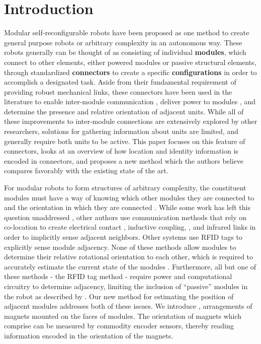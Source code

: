 \section{Introduction}
\label{sec:Introduction}

Modular self-reconfigurable robots have been proposed as one method to create general purpose robots or arbitrary complexity in an autonomous way. These robots generally can be thought of as consisting of individual \textbf{modules}, which connect to other elements, either powered modules or passive structural elements, through standardized \textbf{connectors} to create a specific \textbf{configurations} in order to accomplish a designated task. Aside from their fundamental requirement of providing robust mechanical links, these connectors have been used in the literature to enable inter-module communication \cite{liedke2013collective} \cite{TosunDaveyLiuYim-IROS2016}, deliver power to modules \cite{todo} \cite{todo}, and determine the presence and relative orientation of adjacent units. While all of these improvements to inter-module connections are extensively explored by other researchers, solutions for gathering information about units are limited, and generally require both units to be active.  This paper focuses on this feature of connectors, looks at an overview of how location and identity information is encoded in connectors, and proposes a new method which the authors believe compares favorably with the existing state of the art.

For modular robots to form structures of arbitrary complexity, the constituent modules must have a way of knowing which other modules they are connected to and the orientation in which they are connected \cite{todo!}. While some work has left this question unaddressed \cite{todo}, other authors use communication methods that rely on co-location to create electrical contact \cite{liedke2013collective}, inductive coupling, \cite{Gilpin-Thesis06} \cite{TosunDaveyLiuYim-IROS2016}, and infrared links in order to implicitly sense adjacent neighbors.  Other systems use RFID tags \cite{Werfel-PhDThesis06} to explicitly sense module adjacency.  None of these methods allow modules to determine their relative rotational orientation to each other, which is required to accurately estimate the current state of the modules \cite{todo?}.  Furthermore, all but one of these methods - the RFID tag method - require power and computational circuitry to determine adjacency, limiting the inclusion of ``passive'' modules in the robot as described by \cite{roombots5}.  Our new method for estimating the position of adjacent modules addresses both of these issues.  We introduce \tagNamePlural, arrangements of magnets mounted on the faces of modules.  The orientation of magnets which comprise \tagNamePlural can be measured by commodity encoder sensors, thereby reading information encoded in the orientation of the magnets.

